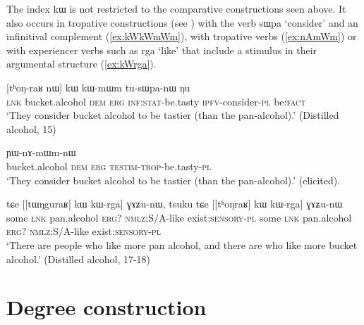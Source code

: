 \documentclass[oldfontcommands,oneside,a4paper,11pt]{article}
\newcommand{\ipa}[1]{{\phon #1}} %
\begin{document}
 
The index \ipa{kɯ} is not restricted to the comparative constructions seen above. It also occurs in  tropative constructions (see \citealt{jacques13tropative}) with the verb \ipa{sɯpa} `consider' and an infinitival complement (\ref{ex:kWkWmWm}), with   tropative verbs (\ref{ex:nAmWm}) or with experiencer verbs such as \ipa{rga} `like' that include  a stimulus in their argumental structure (\ref{ex:kWrga}).

\begin{exe}
\ex \label{ex:kWkWmWm}
\gll  \ipa{tɕe}   [\ipa{tʰoŋ-raʁ}   	\ipa{nɯ}]   	\ipa{kɯ}   	\ipa{kɯ-mɯm}   	\ipa{tu-sɯpa-nɯ}   	\ipa{ŋu}   \\
\textsc{lnk} bucket.alcohol \textsc{dem} \textsc{erg} \textsc{inf:stat}-be.tasty \textsc{ipfv}-consider-\textsc{pl} be:\textsc{fact} \\
\glt `They consider  bucket alcohol to be tastier (than the pan-alcohol).' (Distilled alcohol, 15)
\end{exe}

\begin{exe}
\ex \label{ex:nAmWm}
\gll  [\ipa{tʰoŋraʁ} 	\ipa{nɯ}] 	\ipa{kɯ} 	\ipa{ɲɯ-nɤ-mɯm-nɯ} \\
 bucket.alcohol \textsc{dem} \textsc{erg}  \textsc{testim-trop}-be.tasty-\textsc{pl} \\
 \glt `They consider  bucket alcohol to be tastier (than the pan-alcohol).'  (elicited).
\end{exe}

\begin{exe}
\ex \label{ex:kWrga}
\gll \ipa{tsuku}   	\ipa{tɕe}   	 [[\ipa{tɯŋguraʁ}]   	\ipa{kɯ}   	\ipa{kɯ-rga}]   	\ipa{ɣɤʑu-nɯ,}   		\ipa{tsuku}   	\ipa{tɕe}   	[[\ipa{tʰoŋraʁ}]   	\ipa{kɯ}   	\ipa{kɯ-rga}]   	\ipa{ɣɤʑu-nɯ}   \\
some \textsc{lnk} pan.alcohol \textsc{erg?} \textsc{nmlz:S/A}-like exist\textsc{:sensory}-\textsc{pl} some \textsc{lnk} pan.alcohol \textsc{erg?} \textsc{nmlz:S/A}-like exist\textsc{:sensory}-\textsc{pl} \\
\glt `There are people who like more pan alcohol, and there are who like more bucket alcohol.' (Distilled alcohol, 17-18)
\end{exe}


%
 
\section{Degree construction} \label{sec:degree}
 
\end{document}
